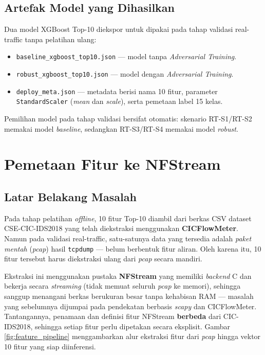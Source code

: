\documentclass[11pt, a4paper]{article}
\begin{document}
\subsection{Artefak Model yang Dihasilkan}
Dua model XGBoost Top-10 diekspor untuk dipakai pada tahap validasi real-traffic tanpa pelatihan ulang:
\begin{itemize}[leftmargin=1.4cm]
    \item \texttt{baseline\_xgboost\_top10.json} --- model tanpa \textit{Adversarial Training}.
    \item \texttt{robust\_xgboost\_top10.json} --- model dengan \textit{Adversarial Training}.
    \item \texttt{deploy\_meta.json} --- metadata berisi nama 10 fitur, parameter \texttt{StandardScaler} (\textit{mean} dan \textit{scale}), serta pemetaan label 15 kelas.
\end{itemize}
Pemilihan model pada tahap validasi bersifat otomatis: skenario RT-S1/RT-S2 memakai model \textit{baseline}, sedangkan RT-S3/RT-S4 memakai model \textit{robust}.

\section{Pemetaan Fitur ke NFStream}

\subsection{Latar Belakang Masalah}
Pada tahap pelatihan \textit{offline}, 10 fitur Top-10 diambil dari berkas CSV dataset CSE-CIC-IDS2018 yang telah diekstraksi menggunakan \textbf{CICFlowMeter}. Namun pada validasi real-traffic, satu-satunya data yang tersedia adalah \textit{paket mentah} (\textit{pcap}) hasil \texttt{tcpdump} --- belum berbentuk fitur aliran. Oleh karena itu, 10 fitur tersebut harus diekstraksi ulang dari \textit{pcap} secara mandiri.

Ekstraksi ini menggunakan pustaka \textbf{NFStream} yang memiliki \textit{backend} C dan bekerja secara \textit{streaming} (tidak memuat seluruh \textit{pcap} ke memori), sehingga sanggup menangani berkas berukuran besar tanpa kehabisan RAM --- masalah yang sebelumnya dijumpai pada pendekatan berbasis \textit{scapy} dan CICFlowMeter. Tantangannya, penamaan dan definisi fitur NFStream \textbf{berbeda} dari CIC-IDS2018, sehingga setiap fitur perlu dipetakan secara eksplisit. Gambar \ref{fig:feature_pipeline} menggambarkan alur ekstraksi fitur dari \textit{pcap} hingga vektor 10 fitur yang siap diinferensi.
\end{document}
